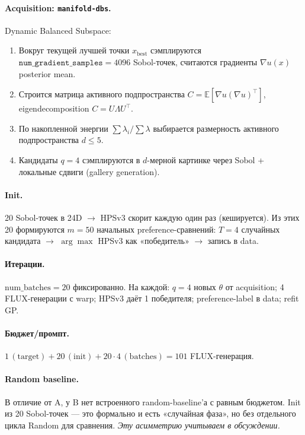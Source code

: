 \documentclass[11pt,a4paper]{article}
\begin{document}
\paragraph{Acquisition: \texttt{manifold-dbs}.}
Dynamic Balanced Subspace:
\begin{enumerate}[leftmargin=2em,itemsep=2pt]
  \item Вокруг текущей лучшей точки $x_\text{best}$ сэмплируются
        $\mathtt{num\_gradient\_samples} = 4096$ Sobol-точек, считаются
        градиенты $\nabla u(x)$ posterior mean.
  \item Строится матрица активного подпространства
        $C = \mathbb{E}[\nabla u (\nabla u)^\top]$, eigendecomposition
        $C = U\Lambda U^\top$.
  \item По накопленной энергии $\sum \lambda_i / \sum \lambda$ выбирается
        размерность активного подпространства $d \le 5$.
  \item Кандидаты $q=4$ сэмплируются в $d$-мерной картинке через
        Sobol + локальные сдвиги (gallery generation).
\end{enumerate}

\paragraph{Init.} 20 Sobol-точек в 24D $\to$ HPSv3 скорит каждую один раз
(кешируется). Из этих 20 формируются $m=50$ начальных preference-сравнений:
$T=4$ случайных кандидата $\to$ \(\arg\max\) HPSv3 как «победитель»
$\to$ запись в data.

\paragraph{Итерации.} $\text{num\_batches} = 20$ фиксированно. На каждой:
$q=4$ новых $\theta$ от acquisition; 4 FLUX-генерации с warp; HPSv3 даёт
1 победителя; preference-label в data; refit GP.

\paragraph{Бюджет/промпт.}
$1\,(\text{target}) + 20\,(\text{init}) + 20\cdot 4\,(\text{batches})
 = 101$ FLUX-генерация.

\paragraph{Random baseline.} В отличие от A, у B нет встроенного
random-baseline'а с равным бюджетом. Init из 20 Sobol-точек --- это
формально и есть «случайная фаза», но без отдельного цикла Random
для сравнения. \emph{Эту асимметрию учитываем в обсуждении.}
\end{document}
